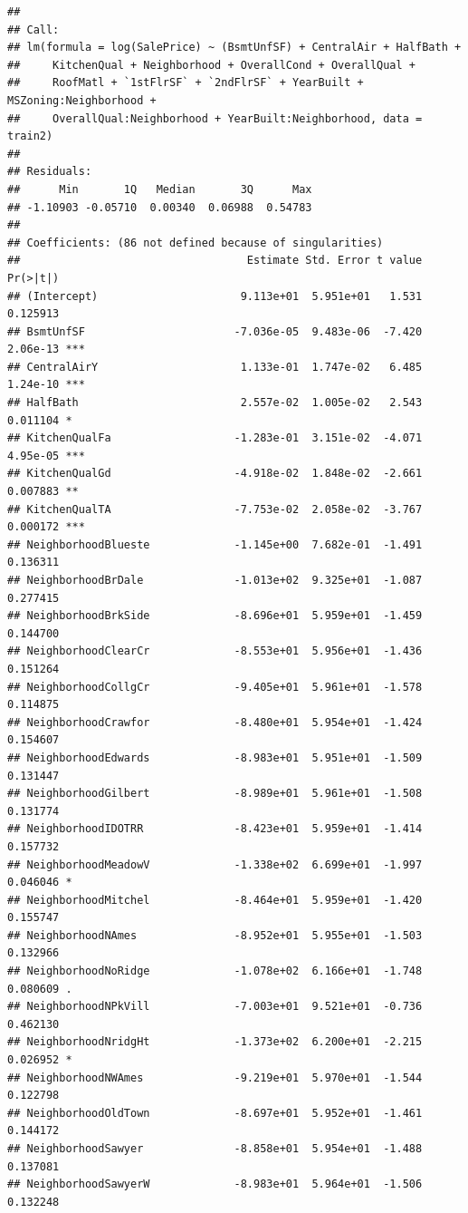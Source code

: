 \documentclass[american,]{article}
\theoremstyle{definition}
\theoremstyle{definition}
\theoremstyle{definition}
\theoremstyle{remark}
\begin{document}
\begin{verbatim}
## 
## Call:
## lm(formula = log(SalePrice) ~ (BsmtUnfSF) + CentralAir + HalfBath + 
##     KitchenQual + Neighborhood + OverallCond + OverallQual + 
##     RoofMatl + `1stFlrSF` + `2ndFlrSF` + YearBuilt + MSZoning:Neighborhood + 
##     OverallQual:Neighborhood + YearBuilt:Neighborhood, data = train2)
## 
## Residuals:
##      Min       1Q   Median       3Q      Max 
## -1.10903 -0.05710  0.00340  0.06988  0.54783 
## 
## Coefficients: (86 not defined because of singularities)
##                                   Estimate Std. Error t value Pr(>|t|)    
## (Intercept)                      9.113e+01  5.951e+01   1.531 0.125913    
## BsmtUnfSF                       -7.036e-05  9.483e-06  -7.420 2.06e-13 ***
## CentralAirY                      1.133e-01  1.747e-02   6.485 1.24e-10 ***
## HalfBath                         2.557e-02  1.005e-02   2.543 0.011104 *  
## KitchenQualFa                   -1.283e-01  3.151e-02  -4.071 4.95e-05 ***
## KitchenQualGd                   -4.918e-02  1.848e-02  -2.661 0.007883 ** 
## KitchenQualTA                   -7.753e-02  2.058e-02  -3.767 0.000172 ***
## NeighborhoodBlueste             -1.145e+00  7.682e-01  -1.491 0.136311    
## NeighborhoodBrDale              -1.013e+02  9.325e+01  -1.087 0.277415    
## NeighborhoodBrkSide             -8.696e+01  5.959e+01  -1.459 0.144700    
## NeighborhoodClearCr             -8.553e+01  5.956e+01  -1.436 0.151264    
## NeighborhoodCollgCr             -9.405e+01  5.961e+01  -1.578 0.114875    
## NeighborhoodCrawfor             -8.480e+01  5.954e+01  -1.424 0.154607    
## NeighborhoodEdwards             -8.983e+01  5.951e+01  -1.509 0.131447    
## NeighborhoodGilbert             -8.989e+01  5.961e+01  -1.508 0.131774    
## NeighborhoodIDOTRR              -8.423e+01  5.959e+01  -1.414 0.157732    
## NeighborhoodMeadowV             -1.338e+02  6.699e+01  -1.997 0.046046 *  
## NeighborhoodMitchel             -8.464e+01  5.959e+01  -1.420 0.155747    
## NeighborhoodNAmes               -8.952e+01  5.955e+01  -1.503 0.132966    
## NeighborhoodNoRidge             -1.078e+02  6.166e+01  -1.748 0.080609 .  
## NeighborhoodNPkVill             -7.003e+01  9.521e+01  -0.736 0.462130    
## NeighborhoodNridgHt             -1.373e+02  6.200e+01  -2.215 0.026952 *  
## NeighborhoodNWAmes              -9.219e+01  5.970e+01  -1.544 0.122798    
## NeighborhoodOldTown             -8.697e+01  5.952e+01  -1.461 0.144172    
## NeighborhoodSawyer              -8.858e+01  5.954e+01  -1.488 0.137081    
## NeighborhoodSawyerW             -8.983e+01  5.964e+01  -1.506 0.132248    

\end{verbatim}
\end{document}
